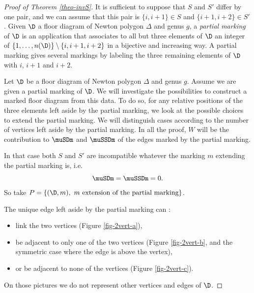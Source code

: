 \begin{proof}[Proof of Theorem \ref{theo-invS}]
It is sufficient to suppose that $S$ and $S'$ differ by one pair, and we can assume that this pair is $\{i,i+1\} \in S$ and $\{i+1,i+2\}\in S'$. 
Given $\D$ a floor diagram of Newton polygon $\Delta$ and genus $g$, a \emph{partial marking} of $\D$ is an application that associates to all but three elements of $\D$ an integer of $\{1,\dots,n(\D)\} \setminus \{i,i+1,i+2\}$ in a bijective and increasing way. A partial marking gives several markings by labeling the three remaining elements of $\D$ with $i$, $i+1$ and $i+2$. 

Let $\D$ be a floor diagram of Newton polygon $\Delta$ and genus $g$. Assume we are given a partial marking of $\D$. We will investigate the possibilities to construct a marked floor diagram from this data. To do so, for any relative positions of the three elements left aside by the partial marking, we look at the possible choices to extend the partial marking. We will distinguish cases according to the number of vertices left aside by the partial marking. In all the proof, $W$ will be the contribution to $\muSDm$ and $\muSSDm$ of the edges marked by the partial marking. 

 In that case both $S$ and $S'$ are incompatible whatever the marking $m$ extending the partial marking is, i.e.  
 \[ \muSDm = \muSSDm = 0.\]
 So take $P = \{(\D,m),\ m \text{ extension of the partial marking} \}$.


The unique edge left aside by the partial marking can :
\begin{itemize}
    \item link the two vertices (Figure \ref{fig-2vert-a}),
    \item be adjacent to only one of the two vertices (Figure \ref{fig-2vert-b}, and the symmetric case where the edge is above the vertex),
    \item or be adjacent to none of the vertices (Figure \ref{fig-2vert-c}).
\end{itemize} 
On those pictures we do not represent other vertices and edges of $\D$. 


\end{proof}
